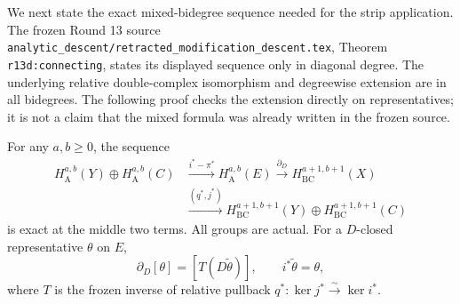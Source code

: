 We next state the exact mixed-bidegree sequence needed for
the strip application.  The frozen Round 13 source
\texttt{analytic\_descent/retracted\_modification\_descent.tex},
Theorem \texttt{r13d:connecting}, states its displayed
sequence only in diagonal degree.  The underlying relative
double-complex isomorphism and degreewise extension are in
all bidegrees.  The following proof checks the extension
directly on representatives; it is not a claim that the
mixed formula was already written in the frozen source.

\begin{proposition}
\label{r15m:mixed-connecting}
For any $a,b\geq0$, the sequence
\[
 \begin{split}
 H_{\mathrm A}^{a,b}(Y)\oplus H_{\mathrm A}^{a,b}(C)
 &\xrightarrow{i^*-\pi^*}H_{\mathrm A}^{a,b}(E)
  \xrightarrow{\partial_D}H_{\mathrm{BC}}^{a+1,b+1}(X)\\
 &\xrightarrow{(q^*,j^*)}
 H_{\mathrm{BC}}^{a+1,b+1}(Y)
                       \oplus H_{\mathrm{BC}}^{a+1,b+1}(C)
 \end{split}
\tag{SD15.6}\label{r15m:mixed-sequence}
\]
is exact at the middle two terms.  All groups are actual.
For a $D$-closed representative $\theta$ on $E$,
\[
                   \partial_D[\theta]
                          =[T(D\widetilde\theta)],
 \qquad i^*\widetilde\theta=\theta,
\tag{SD15.7}\label{r15m:mixed-connecting-formula}
\]
where $T$ is the frozen inverse of relative pullback
$q^*: \ker j^*\xrightarrow{\sim}\ker i^*$.
\end{proposition}

